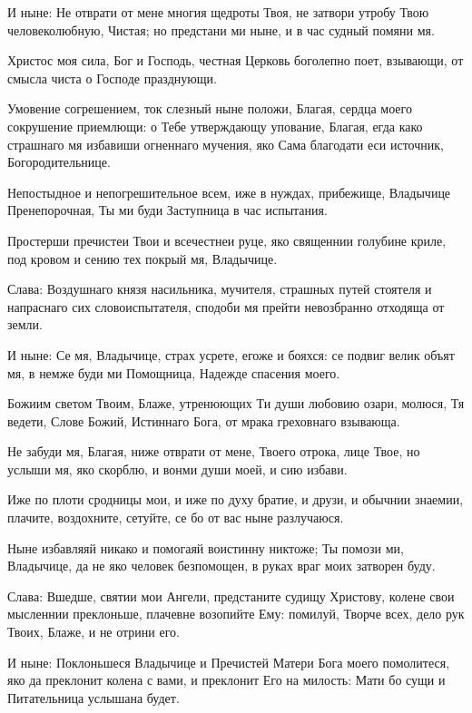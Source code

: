 \begin{mymulticols}
И ныне: Не отврати от мене многия щедроты Твоя, не затвори утробу Твою человеколюбную, Чистая; но предстани ми ныне, и в час судный помяни мя.




 Христос моя сила, Бог и Господь, честная Церковь боголепно поет, взывающи, от смысла чиста о Господе празднующи. 

Умовение согрешением, ток слезный ныне положи, Благая, сердца моего сокрушение приемлющи: о Тебе утверждающу упование, Благая, егда како страшнаго мя избавиши огненнаго мучения, яко Сама благодати еси источник, Богородительнице. 

Непостыдное и непогрешительное всем, иже в нуждах, прибежище, Владычице Пренепорочная, Ты ми буди Заступница в час испытания. 

Простерши пречистеи Твои и всечестнеи руце, яко священнии голубине криле, под кровом и сению тех покрый мя, Владычице. 

Слава: Воздушнаго князя насильника, мучителя, страшных путей стоятеля и напраснаго сих словоиспытателя, сподоби мя прейти невозбранно отходяща от земли. 

И ныне: Се мя, Владычице, страх усрете, егоже и бояхся: се подвиг велик объят мя, в немже буди ми Помощница, Надежде спасения моего.




 Божиим светом Твоим, Блаже, утренюющих Ти души любовию озари, молюся, Тя ведети, Слове Божий, Истиннаго Бога, от мрака греховнаго взывающа. 

Не забуди мя, Благая, ниже отврати от мене, Твоего отрока, лице Твое, но услыши мя, яко скорблю, и вонми души моей, и сию избави. 

Иже по плоти сродницы мои, и иже по духу братие, и друзи, и обычнии знаемии, плачите, воздохните, сетуйте, се бо от вас ныне разлучаюся. 

Ныне избавляяй никако и помогаяй воистинну никтоже; Ты помози ми, Владычице, да не яко человек безпомощен, в руках враг моих затворен буду. 

Слава: Вшедше, святии мои Ангели, предстаните судищу Христову, колене свои мысленнии преклоньше, плачевне возопийте Ему: помилуй, Творче всех, дело рук Твоих, Блаже, и не отрини его. 

И ныне: Поклоньшеся Владычице и Пречистей Матери Бога моего помолитеся, яко да преклонит колена с вами, и преклонит Его на милость: Мати бо сущи и Питательница услышана будет.



\end{mymulticols}
